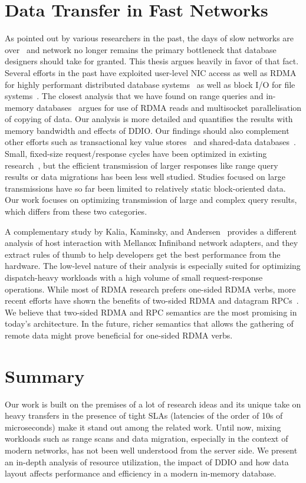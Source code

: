 \section{Data Transfer in Fast Networks}
As pointed out by various researchers in the past, the days of slow networks are over~\cite{slow} 
and network no longer remains the primary bottleneck that database designers should take for granted.
This thesis argues heavily in favor of that fact. Several efforts in the past have exploited
user-level NIC access as well as RDMA for highly performant distributed database systems~\cite{ramcloud,farm,farmtx,drtm,hyper}
as well as block I/O for file systems~\cite{rdmagfs}. The closest analysis that we have found on 
range queries and in-memory databases~\cite{zerocopyrangequery} argues for use of RDMA reads and 
multisocket parallelisation of copying of data. Our analysis is more detailed and quantifies the 
results with memory bandwidth and effects of DDIO.
Our findings should also complement other efforts such as transactional key value stores~\cite{deuteronomy} 
and shared-data databases~\cite{tell}. Small, fixed-size request/response cycles have been optimized in
existing research~\cite{farm,herd,mica,rdma,ramcloud}, but the efficient
transmission of larger responses like range query results or data
migrations has been less well studied. Studies focused on large transmissions
have so far been limited to relatively static block-oriented data.
Our work focuses on optimizing transmission of large and complex query
results, which differs from these two categories. 

A complementary study by Kalia, Kaminsky, and Andersen~\cite{rdma} provides a
different analysis of host interaction with Mellanox Infiniband network adapters,
and they extract rules of thumb to help developers get the best performance from the hardware.
The low-level nature of their analysis is especially suited for
optimizing dispatch-heavy workloads with a high volume of small
request-response operations. While most of RDMA research prefers one-sided RDMA verbs, more recent efforts have shown 
the benefits of two-sided RDMA and datagram RPCs~\cite{fasst}. We believe that 
two-sided RDMA and RPC semantics are the most promising in today's architecture. In the future, 
richer semantics that allows the gathering of remote data might prove beneficial for one-sided RDMA verbs.


\section{Summary}
Our work is built on the premises of a lot of research ideas and its unique take on
heavy transfers in the presence of tight SLAs (latencies of the order of 10s of microseconds)
make it stand out among the related work. Until now, mixing workloads such as range scans 
and data migration, especially in the context of modern networks, has not been well
 understood from the server side. We present an in-depth analysis of resource utilization, 
 the impact of DDIO and how data layout affects performance and efficiency in a modern 
 in-memory database.